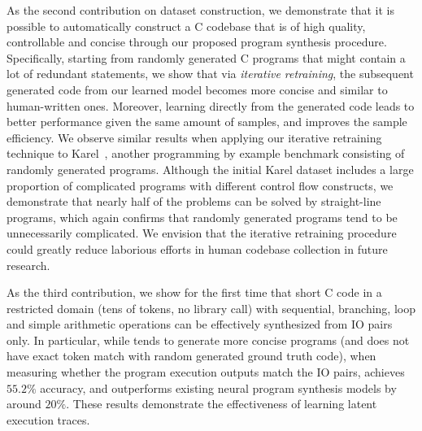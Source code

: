 As the second contribution on dataset construction, we demonstrate that it is possible to automatically construct a C codebase that is of high quality, controllable and concise through our proposed program synthesis procedure. Specifically, starting from randomly generated C programs that might contain a lot of redundant statements, we show that via \emph{iterative retraining}, the subsequent generated code from our learned model becomes more concise and similar to human-written ones. Moreover, learning directly from the generated code leads to better performance given the same amount of samples, and improves the sample efficiency. We observe similar results when applying our iterative retraining technique to Karel~\cite{bunel2018leveraging}, another programming by example benchmark consisting of randomly generated programs. Although the initial Karel dataset includes a large proportion of complicated programs with different control flow constructs, we demonstrate that nearly half of the problems can be solved by straight-line programs, which again confirms that randomly generated programs tend to be unnecessarily complicated. We envision that the iterative retraining procedure could greatly reduce laborious efforts in human codebase collection in future research. 

As the third contribution, we show for the first time that short C code in a restricted domain (tens of tokens, no library call) with sequential, branching, loop and simple arithmetic operations can be effectively synthesized from IO pairs only. In particular, while \ours{} tends to generate more concise programs (and does not have exact token match with random generated ground truth code), when measuring whether the program execution outputs match the IO pairs, \ours{} achieves $55.2\%$ accuracy, and outperforms existing neural program synthesis models by around $20\%$. These results demonstrate the effectiveness of learning latent execution traces.

